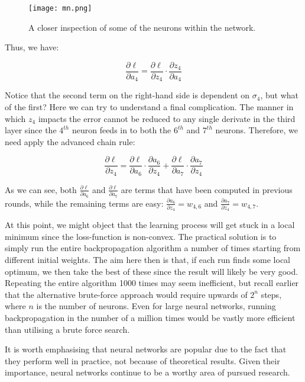 \documentclass[11pt]{article}
\begin{document}
\begin{figure}[h]
    \centering
    \texttt{[image: mn.png]}
    \caption{A closer inspection of some of the neurons within the network.}   
\end{figure}

Thus, we have:

\begin{equation}\frac{\partial\ell }{\partial a_{4}} = \frac{\partial \ell}{\partial z_{4}} \cdot \frac{\partial z_{4}}{\partial a_{4}} \nonumber\end{equation}

Notice that the second term on the right-hand side is dependent on $\sigma_{4}$, but what of the first? Here we can try to understand a final complication. The manner in which $z_{4}$ impacts the error cannot be reduced to any single derivate in the third layer since the $4^{th}$ neuron feeds in to both the $6^{th}$ and $7^{th}$ neurons. Therefore, we need apply the advanced chain rule:

\begin{equation}\frac{\partial \ell}{\partial z_{4}}= \frac{\partial \ell }{\partial a_{6}} \cdot \frac{\partial a_{6}}{\partial z_{4}}+ \frac{\partial \ell}{\partial a_{7}} \cdot \frac{\partial a_{7}}{\partial z_{4}} \nonumber\end{equation}

As we can see, both $\frac{\partial \ell }{\partial a_{6}}$ and $\frac{\partial \ell}{\partial a_{7}}$ are terms that have been computed in previous rounds, while the remaining terms are easy: $\frac{\partial a_{6}}{\partial z_{4}} = w_{4, 6}$ and $\frac{\partial a_{7}}{\partial z_{4}}=w_{4, 7}$.

At this point, we might object that the learning process will get stuck in a local minimum since the loss-function is non-convex. The practical solution is to simply run the entire backpropagation algorithm a number of times starting from different initial weights. The aim here then is that, if each run finds some local optimum, we then take the best of these since the result will likely be very good. Repeating the entire algorithm 1000 times may seem inefficient, but recall earlier that the alternative brute-force approach would require upwards of $2^{n}$ steps, where $n$ is the number of neurons. Even for large neural networks, running backpropagation in the number of a million times would be vastly more efficient than utilising a brute force search.

It is worth emphasising that neural networks are popular due to the fact that they perform well in practice, not because of theoretical results. Given their importance, neural networks continue to be a worthy area of pursued research.
\end{document}
